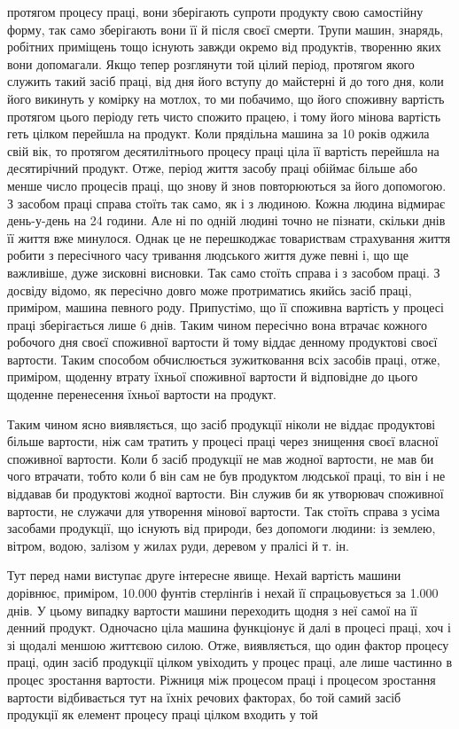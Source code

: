 \parcont{}  %
протягом процесу праці, вони зберігають супроти продукту свою
самостійну форму, так само зберігають вони її й після своєї смерти.
Трупи машин, знарядь, робітних приміщень тощо існують завжди
окремо від продуктів, творенню яких вони допомагали. Якщо
тепер розглянути той цілий період, протягом якого служить такий
засіб праці, від дня його вступу до майстерні й до того дня, коли
його викинуть у комірку на мотлох, то ми побачимо, що його
споживну вартість протягом цього періоду геть чисто спожито
працею, і тому його мінова вартість геть цілком перейшла на
продукт. Коли прядільна машина за 10 років оджила свій вік,
то протягом десятилітнього процесу праці ціла її вартість перейшла
на десятирічний продукт. Отже, період життя засобу праці
обіймає більше або менше число процесів праці, що знову й знов
повторюються за його допомогою. З засобом праці справа стоїть
так само, як і з людиною. Кожна людина відмирає день-у-день
на 24 години. Але ні по одній людині точно не пізнати, скільки
днів її життя вже минулося. Однак це не перешкоджає товариствам
страхування життя робити з пересічного часу тривання людського
життя дуже певні і, що ще важливіше, дуже зисковні висновки.
Так само стоїть справа і з засобом праці. З досвіду відомо, як
пересічно довго може протриматись якийсь засіб праці, приміром,
машина певного роду. Припустімо, що її споживна вартість у
процесі праці зберігається лише 6 днів. Таким чином пересічно
вона втрачає кожного робочого дня  своєї споживної вартости
й тому віддає денному продуктові  своєї вартости. Таким способом
обчислюється зужитковання всіх засобів праці, отже,
приміром, щоденну втрату їхньої споживної вартости й відповідне
до цього щоденне перенесення їхньої вартости на продукт.

Таким чином ясно виявляється, що засіб продукції ніколи не
віддає продуктові більше вартости, ніж сам тратить у процесі
праці через знищення своєї власної споживної вартости. Коли б
засіб продукції не мав жодної вартости, не мав би чого втрачати,
тобто коли б він сам не був продуктом людської праці, то він і
не віддавав би продуктові жодної вартости. Він служив би як
утворювач споживної вартости, не служачи для утворення мінової
вартости. Так стоїть справа з усіма засобами продукції, що
існують від природи, без допомоги людини: із землею, вітром,
водою, залізом у жилах руди, деревом у пралісі й т. ін.

Тут перед нами виступає друге інтересне явище. Нехай вартість
машини дорівнює, приміром, 10.000 фунтів стерлінґів
і нехай її спрацьовується за 1.000 днів. У цьому випадку  вартости
машини переходить щодня з неї самої на її денний продукт.
Одночасно ціла машина функціонує й далі в процесі праці, хоч
і зі щодалі меншою життєвою силою. Отже, виявляється, що
один фактор процесу праці, один засіб продукції цілком увіходить
у процес праці, але лише частинно в процес зростання вартости.
Ріжниця між процесом праці і процесом зростання вартости
відбивається тут на їхніх речових факторах, бо той самий
засіб продукції як елемент процесу праці цілком входить у той
\parbreak{}  %
